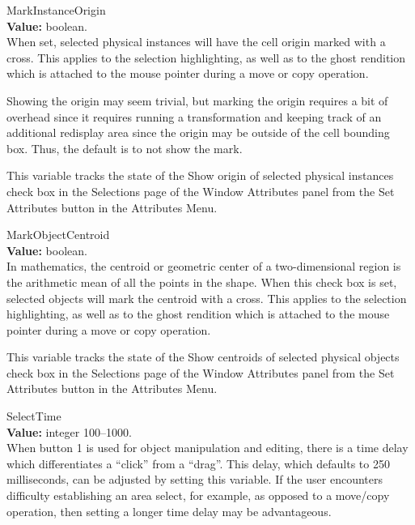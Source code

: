 \begin{description}
\item{\et MarkInstanceOrigin}\\
{\bf Value:} boolean.\\
When set, selected physical instances will have the cell origin marked
with a cross.  This applies to the selection highlighting, as well as
to the ghost rendition which is attached to the mouse pointer during a
move or copy operation.

Showing the origin may seem trivial, but marking the origin requires a
bit of overhead since it requires running a transformation and keeping
track of an additional redisplay area since the origin may be outside
of the cell bounding box.  Thus, the default is to not show the mark.

This variable tracks the state of the {\cb Show origin of selected
physical instances} check box in the {\cb Selections} page of the {\cb
Window Attributes} panel from the {\cb Set Attributes} button in the
{\cb Attributes Menu}.

\item{\et MarkObjectCentroid}\\
{\bf Value:} boolean.\\
In mathematics, the centroid or geometric center of a two-dimensional
region is the arithmetic mean of all the points in the shape.  When
this check box is set, selected objects will mark the centroid with a
cross.  This applies to the selection highlighting, as well as to the
ghost rendition which is attached to the mouse pointer during a move
or copy operation.

This variable tracks the state of the {\cb Show centroids of selected
physical objects} check box in the {\cb Selections} page of the {\cb
Window Attributes} panel from the {\cb Set Attributes} button in the
{\cb Attributes Menu}.

\item{\et SelectTime}\\
{\bf Value:} integer 100--1000.\\
When button 1 is used for object manipulation and editing, there is a
time delay which differentiates a ``click'' from a ``drag''.  This
delay, which defaults to 250 milliseconds, can be adjusted by setting
this variable.  If the user encounters difficulty establishing an area
select, for example, as opposed to a move/copy operation, then setting
a longer time delay may be advantageous.


\end{description}
